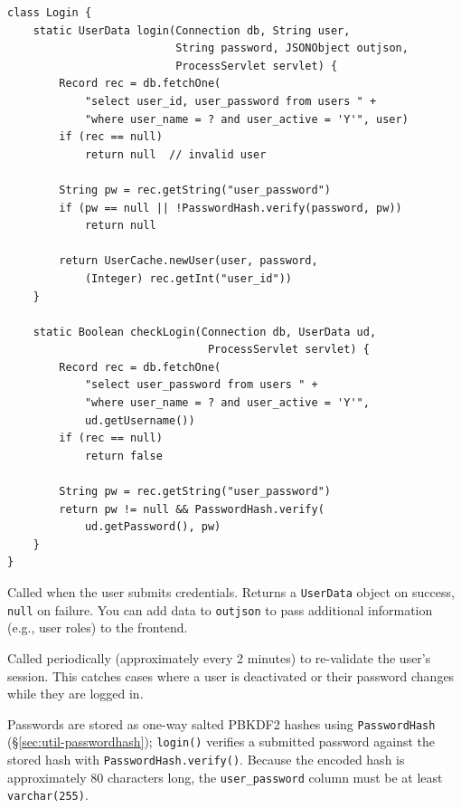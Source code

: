 \begin{lstlisting}[style=groovy]
class Login {
    static UserData login(Connection db, String user,
                          String password, JSONObject outjson,
                          ProcessServlet servlet) {
        Record rec = db.fetchOne(
            "select user_id, user_password from users " +
            "where user_name = ? and user_active = 'Y'", user)
        if (rec == null)
            return null  // invalid user

        String pw = rec.getString("user_password")
        if (pw == null || !PasswordHash.verify(password, pw))
            return null

        return UserCache.newUser(user, password,
            (Integer) rec.getInt("user_id"))
    }

    static Boolean checkLogin(Connection db, UserData ud,
                               ProcessServlet servlet) {
        Record rec = db.fetchOne(
            "select user_password from users " +
            "where user_name = ? and user_active = 'Y'",
            ud.getUsername())
        if (rec == null)
            return false

        String pw = rec.getString("user_password")
        return pw != null && PasswordHash.verify(
            ud.getPassword(), pw)
    }
}
\end{lstlisting}

\begin{description}[style=nextline]
  \item[\texttt{login()}] Called when the user submits credentials.  Returns a \texttt{UserData} object on success, \texttt{null} on failure.  You can add data to \texttt{outjson} to pass additional information (e.g., user roles) to the frontend.
  \item[\texttt{checkLogin()}] Called periodically (approximately every 2 minutes) to re-validate the user's session.  This catches cases where a user is deactivated or their password changes while they are logged in.
\end{description}

\begin{notebox}
Passwords are stored as one-way salted PBKDF2 hashes using \texttt{PasswordHash} (\S\ref{sec:util-passwordhash}); \texttt{login()} verifies a submitted password against the stored hash with \texttt{PasswordHash.verify()}.  Because the encoded hash is approximately 80 characters long, the \texttt{user\_password} column must be at least \texttt{varchar(255)}.
\end{notebox}

